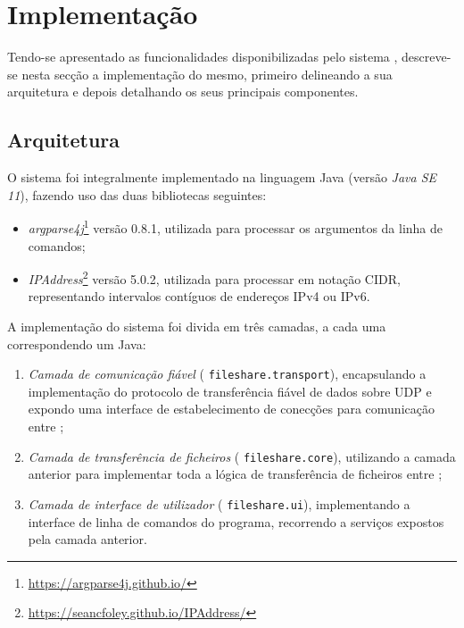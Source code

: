 
\section{Implementação}
\label{sec:impl}

Tendo-se apresentado as funcionalidades disponibilizadas pelo sistema \SYS, descre\-ve-se nesta secção a implementação do mesmo, primeiro delineando a sua arquitetura e depois detalhando os seus principais componentes.


\subsection{Arquitetura}

O sistema foi integralmente implementado na linguagem Java (versão \emph{Java SE 11}), fazendo uso das duas bibliotecas seguintes:

\begin{itemize}

    \item \emph{argparse4j}\footnote{\url{https://argparse4j.github.io/}} versão 0.8.1, utilizada para processar os argumentos da linha de comandos;
    
    \item \emph{IPAddress}\footnote{\url{https://seancfoley.github.io/IPAddress/}} versão 5.0.2, utilizada para processar  em notação CIDR, representando intervalos contíguos de endereços IPv4 ou IPv6.
    
\end{itemize}

A implementação do sistema foi divida em três camadas, a cada uma correspondendo um  Java:

\begin{enumerate}

    \item \emph{Camada de comunicação fiável} ( \texttt{fileshare.transport}), encapsulando a implementação do protocolo de transferência fiável de dados sobre UDP e expondo uma interface de estabelecimento de conecções para comunicação entre ;

    \item \emph{Camada de transferência de ficheiros} ( \texttt{fileshare.core}), utilizando a camada anterior para implementar toda a lógica de transferência de ficheiros entre ;

    \item \emph{Camada de interface de utilizador} ( \texttt{fileshare.ui}), implementando a interface de linha de comandos do programa, recorrendo a serviços expostos pela camada anterior.

\end{enumerate}

